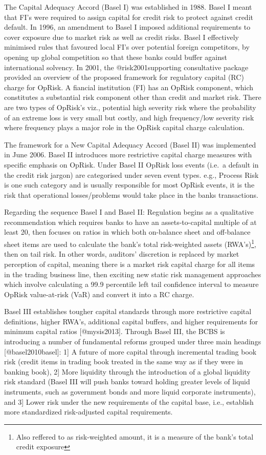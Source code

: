 \documentclass[]{article}
\let\rmarkdownfootnote\footnote%
\def\footnote{\protect\rmarkdownfootnote}
\begin{document}
The Capital Adequacy Accord (Basel I) was established in 1988. Basel I
meant that FI's were required to assign capital for credit risk to
protect against credit default. In 1996, an amendment to Basel I imposed
additional requirements to cover exposure due to market risk as well as
credit risks. Basel I effectively minimised rules that favoured local
FI's over potential foreign competitors, by opening up global
competition so that these banks could buffer against international
solvency. In 2001, the @risk2001supporting consultative package provided
an overview of the proposed framework for regulatory capital (RC) charge
for OpRisk. A fiancial institution (FI) has an OpRisk component, which
constitutes a substantial risk component other than credit and market
risk. There are two types of OpRisk's viz., potential high severity risk
where the probability of an extreme loss is very small but costly, and
high frequency/low severity risk where frequency plays a major role in
the OpRisk capital charge calculation.\medskip 

The framework for a New Capital Adequacy Accord (Basel II) was
implemented in June 2006. Basel II introduces more restrictive capital
charge measures with specific emphasis on OpRisk. Under Basel II OpRisk
loss events (i.e.~a default in the credit risk jargon) are categorised
under seven event types. e.g., Process Risk is one such category and is
usually responsible for most OpRisk events, it is the risk that
operational losses/problems would take place in the banks
transactions.\medskip

Regarding the sequence Basel I and Basel II: Regulation begins as a
qualitative recommendation which requires banks to have an
assets-to-capital multiple of at least 20, then focuses on ratios in
which both on-balance sheet and off-balance sheet items are used to
calculate the bank's total risk-weighted assets
(RWA's)\footnote{Also reffered to as risk-weighted amount, it is a measure of the bank's total credit exposure},
then on tail risk. In other words, auditors' discretion is replaced by
market perception of capital, meaning there is a market risk capital
charge for all items in the trading business line, then exciting new
static risk management approaches which involve calculating a 99.9
percentile left tail confidence interval to measure OpRisk value-at-risk
(VaR) and convert it into a RC charge.\medskip 

Basel III establishes tougher capital standards through more restrictive
capital definitions, higher RWA's, additional capital buffers, and
higher requirements for minimum capital ratios {[}@mysis2013{]}. Through
Basel III, the BCBS is introducing a number of fundamental reforms
grouped under three main headings {[}@basel2010basel{]}: 1{]} A future
of more capital through incremental trading book risk (credit items in
trading book treated in the same way as if they were in banking book),
2{]} More liquidity through the introduction of a global liquidity risk
standard (Basel III will push banks toward holding greater levels of
liquid instruments, such as government bonds and more liquid corporate
instruments), and 3{]} Lower risk under the new requirements of the
capital base, i.e., establish more standardized risk-adjusted capital
requirements.\medskip
\end{document}
